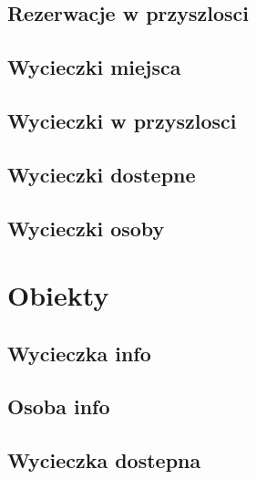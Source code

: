 \documentclass[12pt]{article}
\begin{document}
	\subsection{Rezerwacje w przyszlosci}
	
	
	\pagebreak
	
	\subsection{Wycieczki miejsca}
	
	
	\subsection{Wycieczki w przyszlosci}
	
	
	\subsection{Wycieczki dostepne}
	
	
	\subsection{Wycieczki osoby}
	
	
	\pagebreak
	
	\section{Obiekty}
	
	\subsection{Wycieczka info}
	
	
	\subsection{Osoba info}
	
	
	\subsection{Wycieczka dostepna}
	
	
\end{document}
